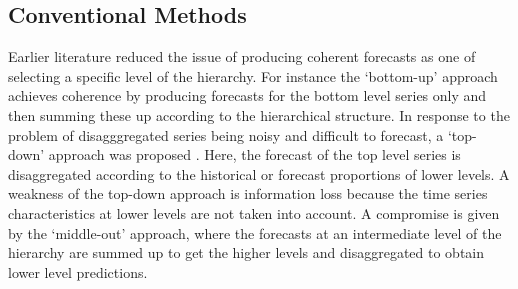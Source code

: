 \documentclass[a4paper,fleqn,11pt]{article}
\begin{document}
\subsection{Conventional Methods}
Earlier literature reduced the issue of producing coherent forecasts as one of selecting a specific level of the hierarchy. For instance the `bottom-up' approach \citep{Gross1990} achieves coherence by producing forecasts for the bottom level series only and then summing these up according to the hierarchical structure. In response to the problem of disagggregated series being noisy and difficult to forecast, a `top-down' approach was proposed \citep[see][and references therein]{Athanasopoulos2009}.  Here, the forecast of the top level series is disaggregated according to the historical or forecast proportions of lower levels. A weakness of the top-down approach is information loss because the time series characteristics at lower levels are not taken into account. A compromise is given by the `middle-out' approach, where the forecasts at an intermediate level of the hierarchy are summed up to get the higher levels and disaggregated to obtain lower level predictions.\\
	
\end{document}
